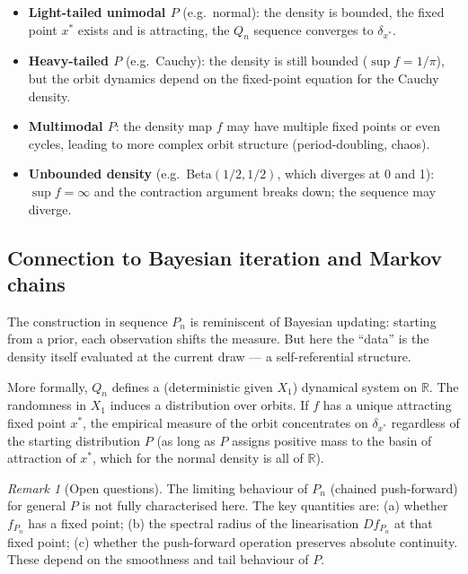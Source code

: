 \documentclass[a4paper,oneside,12pt]{extarticle}
\theoremstyle{plain}
\theoremstyle{definition}
\theoremstyle{remark}
\newtheorem{remark}[proposition]{Remark}
\begin{document}
\begin{itemize}
  \item \textbf{Light-tailed unimodal $P$} (e.g.\ normal): the
    density is bounded, the fixed point $x^*$ exists and is
    attracting, the $Q_n$ sequence converges to $\delta_{x^*}$.

  \item \textbf{Heavy-tailed $P$} (e.g.\ Cauchy): the density is
    still bounded ($\sup f = 1/\pi$), but the orbit dynamics depend
    on the fixed-point equation for the Cauchy density.

  \item \textbf{Multimodal $P$}: the density map $f$ may have
    multiple fixed points or even cycles, leading to more complex
    orbit structure (period-doubling, chaos).

  \item \textbf{Unbounded density} (e.g.\ Beta$(1/2, 1/2)$,
    which diverges at 0 and 1): $\sup f = \infty$ and the
    contraction argument breaks down; the sequence may diverge.
\end{itemize}

\subsection{Connection to Bayesian iteration and Markov chains}

The construction in sequence $P_n$ is reminiscent of Bayesian
updating: starting from a prior, each observation shifts the
measure.  But here the ``data'' is the density itself evaluated at
the current draw --- a self-referential structure.

More formally, $Q_n$ defines a (deterministic given $X_1$)
dynamical system on $\mathbb{R}$.  The randomness in $X_1$ induces
a distribution over orbits.  If $f$ has a unique attracting fixed
point $x^*$, the empirical measure of the orbit concentrates on
$\delta_{x^*}$ regardless of the starting distribution $P$
(as long as $P$ assigns positive mass to the basin of attraction
of $x^*$, which for the normal density is all of $\mathbb{R}$).

\begin{remark}[Open questions]
The limiting behaviour of $P_n$ (chained push-forward) for general
$P$ is not fully characterised here.  The key quantities are:
(a) whether $f_{P_n}$ has a fixed point; (b) the spectral radius
of the linearisation $Df_{P_n}$ at that fixed point; (c) whether
the push-forward operation preserves absolute continuity.
These depend on the smoothness and tail behaviour of $P$.
\end{remark}
\end{document}
